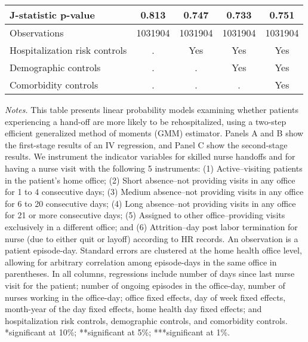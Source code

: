 \documentclass[final,12pt, notitlepage]{article}
\begin{document}
\begin{singlespace}
\begin{table}[H]
\begin{threeparttable}
{\begin{tabular*}{\textwidth}{l@{\extracolsep{\fill}}*{4}{c}}
J-statistic p-value &       0.813   &       0.747   &       0.733   &       0.751   \\
\midrule
Observations        &     1031904   &     1031904   &     1031904   &     1031904   \\
Hospitalization risk controls & . & Yes & Yes & Yes \\
Demographic controls & . & . & Yes & Yes \\
 Comorbidity controls & . & . & . & Yes \\
\bottomrule
\end{tabular*}
}
	\begin{tablenotes}
	\scriptsize
		\item \emph{Notes.} This table presents linear probability models examining whether patients experiencing a hand-off are more likely to be rehospitalized, using a two-step efficient generalized method of moments (GMM) estimator.
	Panels A and B show the first-stage results of an IV regression, and Panel C show the second-stage results.
	We instrument the indicator variables for skilled nurse handoffs and for having a nurse visit with the following 5 instruments:
(1) Active--visiting patients in the patient's home office;
(2) Short absence--not providing visits in any office for 1 to 4 consecutive days;
(3) Medium absence--not providing visits in any office for 6 to 20 consecutive days;
(4) Long absence--not providing visits in any office for 21 or more consecutive days;
(5) Assigned to other office--providing visits exclusively in a different office; and
(6) Attrition--day post labor termination for nurse (due to either quit or layoff) according to HR records.
	An observation is a patient episode-day.
	Standard errors are clustered at the home health office level, allowing for arbitrary correlation among episode-days in the same office in parentheses.
	In all columns, regressions include number of days since last nurse visit for the patient; number of ongoing episodes in the office-day, number of nurses working in the office-day; office fixed effects, day of week fixed effects, month-year of the day fixed effects, home health day fixed effects; and hospitalization risk controls, demographic controls, and comorbidity controls.
	*significant at 10\%; **significant at 5\%; ***significant at 1\%.
	\end{tablenotes}
\end{threeparttable}
\end{table}



\end{singlespace}
\end{document}
